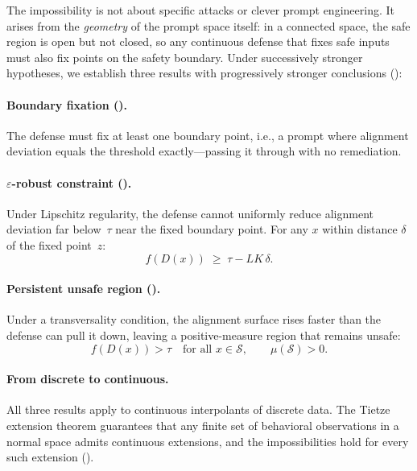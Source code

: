 \documentclass{article}
\begin{document}
The impossibility is not about specific attacks or clever prompt
engineering. It arises from the \emph{geometry} of the prompt space
itself: in a connected space, the safe region is open but not closed,
so any continuous defense that fixes safe inputs must also fix points
on the safety boundary. Under successively stronger hypotheses,
we establish three results with progressively stronger conclusions
():

\paragraph{Boundary fixation ().}
The defense must fix at least one boundary point, i.e., a prompt where
alignment deviation equals the threshold exactly---passing it through
with no remediation.

\paragraph{$\varepsilon$-robust constraint ().}
Under Lipschitz regularity, the defense cannot uniformly reduce
alignment deviation far below~$\tau$ near the fixed boundary point.
For any $x$ within distance $\delta$ of the fixed point~$z$:
\begin{equation}
  f(D(x)) \;\geq\; \tau - LK\,\delta.
\end{equation}

\paragraph{Persistent unsafe region ().}
Under a transversality condition, the alignment surface rises faster
than the defense can pull it down, leaving a positive-measure region
that remains unsafe:
\begin{equation}
  f(D(x)) > \tau \quad\text{for all } x \in \mathcal{S},
  \qquad \mu(\mathcal{S}) > 0.
\end{equation}

\paragraph{From discrete to continuous.}
All three results apply to continuous interpolants of discrete data.
The Tietze extension theorem guarantees that any finite set of
behavioral observations in a normal space admits continuous extensions,
and the impossibilities hold for every such extension
().
\end{document}
